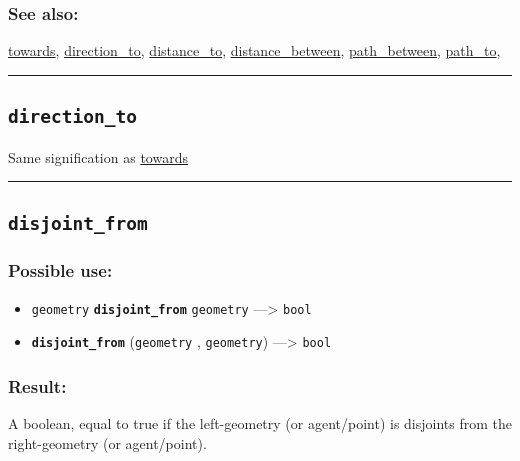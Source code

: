 \documentclass[]{book}
\providecommand{\tightlist}{%
  \setlength{\itemsep}{0pt}\setlength{\parskip}{0pt}}
\theoremstyle{definition}
\theoremstyle{definition}
\theoremstyle{definition}
\theoremstyle{remark}
\begin{document}
\subsubsection{See also:}\label{see-also-78}

\href{OperatorsSZ\#towards}{towards},
\href{OperatorsDH\#direction_to}{direction\_to},
\href{OperatorsDH\#distance_to}{distance\_to},
\href{OperatorsDH\#distance_between}{distance\_between},
\href{OperatorsNR\#path_between}{path\_between},
\href{OperatorsNR\#path_to}{path\_to},

\begin{center}\rule{0.5\linewidth}{\linethickness}\end{center}

\subsection{\texorpdfstring{\texttt{direction\_to}}{direction\_to}}\label{direction_to}

Same signification as \href{OperatorsSZ\#towards}{towards}

\begin{center}\rule{0.5\linewidth}{\linethickness}\end{center}

\subsection{\texorpdfstring{\texttt{disjoint\_from}}{disjoint\_from}}\label{disjoint_from}

\subsubsection{Possible use:}\label{possible-use-134}

\begin{itemize}
\tightlist
\item
  \texttt{geometry} \textbf{\texttt{disjoint\_from}} \texttt{geometry}
  ---\textgreater{} \texttt{bool}
\item
  \textbf{\texttt{disjoint\_from}} (\texttt{geometry} ,
  \texttt{geometry}) ---\textgreater{} \texttt{bool}
\end{itemize}

\subsubsection{Result:}\label{result-130}

A boolean, equal to true if the left-geometry (or agent/point) is
disjoints from the right-geometry (or agent/point).
\end{document}
